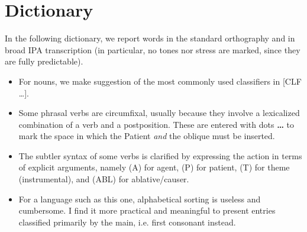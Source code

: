 \documentclass[11pt,a5paper]{book}
\newcommand{\qcn}[1]{\textcolor{AccentText}{\large\textbf{#1}}}
\begin{document}
\section{Dictionary}

In the following dictionary, we report words in the standard orthography and in broad IPA transcription (in particular, no tones nor stress are marked, since they are fully predictable).

\begin{itemize}
	\item For nouns, we make suggestion of the most commonly used classifiers in [CLF \ldots].
	\item Some phrasal verbs are circumfixal, usually because they involve a lexicalized combination of a verb and a postposition. These are entered with dots \qcn{\ldots} to mark the space in which the Patient \emph{and} the oblique must be inserted.
	\item The subtler syntax of some verbs is clarified by expressing the action in terms of explicit arguments, namely (A) for agent, (P) for patient, (T) for theme (instrumental), and (ABL) for ablative/causer.
	\item For a language such as this one, alphabetical sorting is useless and cumbersome. I find it more practical and meaningful to present entries classified primarily by the main, i.e. first consonant instead.
\end{itemize}




\newcommand{\lettersection}[1]{
	\vspace{0.5em}
	\begin{center}
		\Large #1
	\end{center}
 	\par
}

\newcommand{\dictentry}[3]{\qcn{#1} - /#2/ \hangindent=0.4cm #3 \par }
\newcommand{\dictsense}[3]{$\bullet$~\emph{#1} #2 #3 }
\newcommand{\dictexample}[2]{\qcn{#1} \emph{#2}}
\newcommand{\dictclassifiers}[1]{\begin{scriptsize}[CLF #1] \end{scriptsize}}
\newcommand{\dictref}[1]{\qcn{#1}}
\newcommand{\dictsensesep}{\,\,}
\newcommand{\dictvariantof}[1]{\textleftarrow variant form of #1}

\newpage

\begin{multicols}{2}
\begin{singlespace}



\end{singlespace}
\end{multicols}
\end{document}
